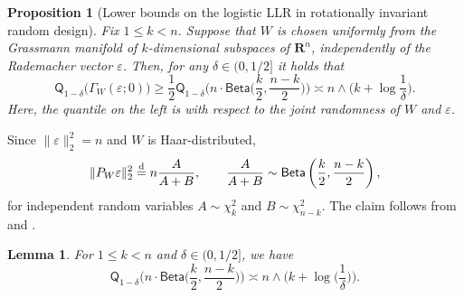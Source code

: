 \documentclass[11pt, letterpaper, hidelinks]{article}
\makeatletter
\renewcommand{\proofname}{\textit{\textbf{Proof}}}
\renewenvironment{proof}[1][\proofname]{\par\pushQED{\qed}\normalfont \topsep6\p@\@plus6\p@\relax\trivlist\item[\hskip\labelsep#1\@addpunct{}]\ignorespaces}{\popQED\endtrivlist\@endpefalse}
\newcommand{\R}{\mathbf R}
\newcommand{\twomin}[2]{\ensuremath{#1 \land #2}}
\newcommand{\1}{\mathbf 1}
\newcommand{\half}{\frac12}
\newcommand{\eps}{\varepsilon}
\renewcommand{\leq}{\leqslant}
\renewcommand{\geq}{\geqslant}
\theoremstyle{plain}
\newtheorem{lemma}{Lemma}[section]
\newtheorem{proposition}{Proposition}[section]
\theoremstyle{definition}
\newcommand{\Quant}[1]{\mathsf{Q}_{#1}}
\makeatother
\begin{document}
\begin{proposition}[Lower bounds on the logistic LLR in rotationally invariant random design]
\label{prop:lower-bound-rand-rot-invariant-logistic-llr}
Fix $1 \leq k < n$. Suppose that $W$ is chosen uniformly from the Grassmann manifold of $k$-dimensional subspaces of $\R^n$, independently of the Rademacher vector $\eps$. Then,
for any $\delta \in (0, 1/2]$ it holds that
\[
\Quant{1-\delta}\Big(\Gamma_W(\eps; 0)\Big) \geq \half \Quant{1-\delta}\Big(n \cdot \mathsf{Beta}\Big(\frac{k}{2}, \frac{n-k}{2}\Big)\Big)
\asymp \twomin{n}{\Big(k + \log \frac{1}{\delta}\Big)}.
\]
Here, the quantile on the left is with respect to the joint randomness of $W$ and $\eps$.
\end{proposition}
\begin{proof}[Proof of~\Cref{prop:lower-bound-rand-rot-invariant-logistic-llr}]
    Since $\|\eps\|_2^2=n$ and $W$ is Haar-distributed,
    \[
    \|P_W \eps\|_2^2 \stackrel{\rm d}{=} n\frac{A}{A+B},
    \qquad
    \frac{A}{A+B}\sim\mathsf{Beta}\left(\frac{k}{2},\frac{n-k}{2}\right),
    \]
    for independent random variables $A \sim \chi^2_k$ and $B \sim \chi^2_{n-k}$. The claim follows from~ and .
\end{proof}

\begin{lemma}
\label{lem:beta-quantile}
For $1 \leq k < n$ and $\delta \in (0, 1/2]$, we have 
\[
\Quant{1-\delta}\bigg(n \cdot \mathsf{Beta}\Big(\frac{k}{2}, \frac{n-k}{2}\Big)\bigg) 
\asymp 
\twomin{n}{\Big(k + \log\Big(\frac{1}{\delta}\Big)\Big)}.
\]
\end{lemma}
\end{document}
